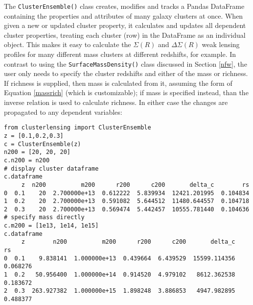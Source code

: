 \documentclass[twocolumn]{aastex6}
\newcommand{\code}{\lstinline[style=codeintext]}
\begin{document}
The \code{ClusterEnsemble()} class creates, modifies and tracks a Pandas DataFrame containing the properties and attributes of many galaxy clusters at once. When given a new or updated cluster property, it calculates and updates all dependent cluster properties, treating each cluster (row) in the DataFrame as an individual object. This makes it easy to calculate the $\Sigma(R)$ and $\Delta\Sigma(R)$ weak lensing profiles for many different mass clusters at different redshifts, for example. In contrast to using the \code{SurfaceMassDensity()} class discussed in Section \ref{nfw}, the user only needs to specify the cluster redshifts and either of the mass or richness. If richness is supplied, then mass is calculated from it, assuming the form of Equation \ref{massrich} (which is customizable); if mass is specified instead, than the inverse relation is used to calculate richness. In either case the changes are propagated to any dependent variables:
\begin{lstlisting}
from clusterlensing import ClusterEnsemble
z = [0.1,0.2,0.3]
c = ClusterEnsemble(z)
n200 = [20, 20, 20]
c.n200 = n200
# display cluster dataframe
c.dataframe
     z  n200          m200      r200      c200       delta_c        rs
0  0.1    20  2.700000e+13  0.612222  5.839934  12421.201995  0.104834
1  0.2    20  2.700000e+13  0.591082  5.644512  11480.644557  0.104718
2  0.3    20  2.700000e+13  0.569474  5.442457  10555.781440  0.104636
# specify mass directly
c.m200 = [1e13, 1e14, 1e15]
c.dataframe
     z        n200          m200      r200      c200       delta_c        rs
0  0.1    9.838141  1.000000e+13  0.439664  6.439529  15599.114356  0.068276
1  0.2   50.956400  1.000000e+14  0.914520  4.979102   8612.362538  0.183672
2  0.3  263.927382  1.000000e+15  1.898248  3.886853   4947.982895  0.488377
\end{lstlisting}
\end{document}
